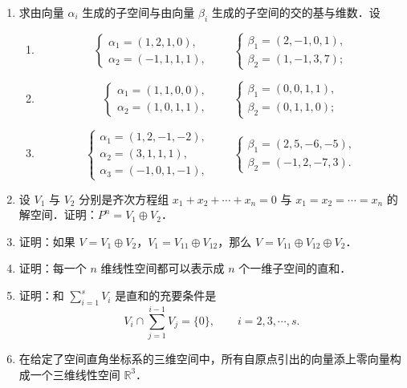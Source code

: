 \begin{enumerate}
\[  \]
  确定的解空间的基与维数．
  \anscompute
  \item 求由向量 $\alpha_i$ 生成的子空间与由向量 $\beta_i$ 生成的子空间的交的基与维数．设
  \begin{enumerate}
    \item
    \[
      \begin{cases}
        \alpha_1=(1,2,1,0),\\
        \alpha_2=(-1,1,1,1),
      \end{cases}
      \qquad
      \begin{cases}
        \beta_1=(2,-1,0,1),\\
        \beta_2=(1,-1,3,7);
      \end{cases}
    \]
  \anssub
    \item
    \[
      \begin{cases}
        \alpha_1=(1,1,0,0),\\
        \alpha_2=(1,0,1,1),
      \end{cases}
      \qquad
      \begin{cases}
        \beta_1=(0,0,1,1),\\
        \beta_2=(0,1,1,0);
      \end{cases}
    \]
  \anssub
    \item
    \[
      \begin{cases}
        \alpha_1=(1,2,-1,-2),\\
        \alpha_2=(3,1,1,1),\\
        \alpha_3=(-1,0,1,-1),
      \end{cases}
      \qquad
      \begin{cases}
        \beta_1=(2,5,-6,-5),\\
        \beta_2=(-1,2,-7,3).
      \end{cases}
    \]
  \anssub
  \end{enumerate}
  \item 设 $V_1$ 与 $V_2$ 分别是齐次方程组 $x_1+x_2+\cdots+x_n=0$ 与 $x_1=x_2=\cdots=x_n$ 的解空间．证明：$P^n=V_1\oplus V_2$．
  \ansproof
  \item 证明：如果 $V=V_1\oplus V_2$，$V_1=V_{11}\oplus V_{12}$，那么 $V=V_{11}\oplus V_{12}\oplus V_2$．
  \ansproof
  \item 证明：每一个 $n$ 维线性空间都可以表示成 $n$ 个一维子空间的直和．
  \ansproof
  \item 证明：和 $\sum\limits_{i=1}^{s}V_i$ 是直和的充要条件是
  \[
    V_i\cap\sum_{j=1}^{i-1}V_j=\{0\},\qquad i=2,3,\cdots,s.
  \]
  \ansproof
  \item 在给定了空间直角坐标系的三维空间中，所有自原点引出的向量添上零向量构成一个三维线性空间 $\mathbb{R}^3$．

\end{enumerate}
